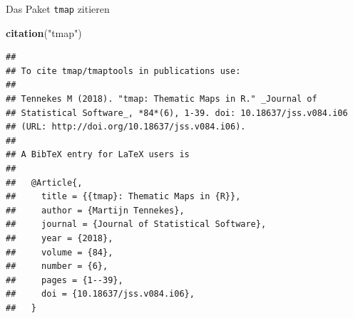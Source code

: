 \documentclass[ignorenonframetext,]{beamer}
\newenvironment{Shaded}{\begin{snugshade}}{\end{snugshade}}
\newcommand{\KeywordTok}[1]{\textcolor[rgb]{0.13,0.29,0.53}{\textbf{#1}}}
\newcommand{\NormalTok}[1]{#1}
\newcommand{\StringTok}[1]{\textcolor[rgb]{0.31,0.60,0.02}{#1}}
\begin{document}
\begin{frame}[fragile]{Das Paket \texttt{tmap} zitieren}
\protect\hypertarget{das-paket-tmap-zitieren}{}

\begin{Shaded}
\begin{Highlighting}[]
\KeywordTok{citation}\NormalTok{(}\StringTok{"tmap"}\NormalTok{)}
\end{Highlighting}
\end{Shaded}

\begin{verbatim}
## 
## To cite tmap/tmaptools in publications use:
## 
## Tennekes M (2018). "tmap: Thematic Maps in R." _Journal of
## Statistical Software_, *84*(6), 1-39. doi: 10.18637/jss.v084.i06
## (URL: http://doi.org/10.18637/jss.v084.i06).
## 
## A BibTeX entry for LaTeX users is
## 
##   @Article{,
##     title = {{tmap}: Thematic Maps in {R}},
##     author = {Martijn Tennekes},
##     journal = {Journal of Statistical Software},
##     year = {2018},
##     volume = {84},
##     number = {6},
##     pages = {1--39},
##     doi = {10.18637/jss.v084.i06},
##   }
\end{verbatim}

\end{frame}
\end{document}
